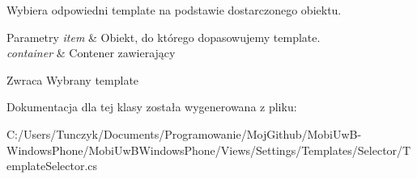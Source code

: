 Wybiera odpowiedni template na podstawie dostarczonego obiektu. 


\begin{DoxyParams}{Parametry}
{\em item} & Obiekt, do którego dopasowujemy template.\\
\hline
{\em container} & Contener zawierający\\
\hline
\end{DoxyParams}
\begin{DoxyReturn}{Zwraca}
Wybrany template
\end{DoxyReturn}


Dokumentacja dla tej klasy została wygenerowana z pliku\+:\begin{DoxyCompactItemize}
\item 
C\+:/\+Users/\+Tunczyk/\+Documents/\+Programowanie/\+Moj\+Github/\+Mobi\+Uw\+B-\/\+Windows\+Phone/\+Mobi\+Uw\+B\+Windows\+Phone/\+Views/\+Settings/\+Templates/\+Selector/Template\+Selector.\+cs\end{DoxyCompactItemize}
